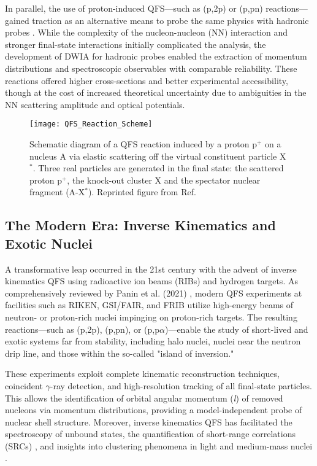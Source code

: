 In parallel, the use of proton-induced \gls{QFS}—such as (p,2p) or (p,pn) reactions—gained traction as an alternative means to probe the same physics with hadronic probes \cite{aumann_quasifree_2013}. While the complexity of the nucleon-nucleon (NN) interaction and stronger final-state interactions initially complicated the analysis, the development of DWIA for hadronic probes enabled the extraction of momentum distributions and spectroscopic observables with comparable reliability. These reactions offered higher cross-sections and better experimental accessibility, though at the cost of increased theoretical uncertainty due to ambiguities in the NN scattering amplitude and optical potentials.

\begin{figure}
	\texttt{[image: QFS\_Reaction\_Scheme]}
	\caption[Schematic of a quasi-free scattering (QFS) reaction]{Schematic diagram of a \gls{QFS} reaction induced by a proton p$^+$ on a nucleus A via elastic scattering off the virtual constituent particle X$^*$. Three real particles are generated in the final state: the scattered proton p$^+$, the knock-out cluster X and the spectator nuclear fragment (A-X$^*$). Reprinted figure from Ref. \cite{panin_quasi-free_2021}}
	\label{fig:QFS_Scheme}
\end{figure}

\subsection{The Modern Era: Inverse Kinematics and Exotic Nuclei}

A transformative leap occurred in the 21st century with the advent of inverse kinematics \gls{QFS} using radioactive ion beams (RIBs) and hydrogen targets. As comprehensively reviewed by Panin et al. (2021) \cite{panin_quasi-free_2021}, modern \gls{QFS} experiments at facilities such as RIKEN, GSI/FAIR, and FRIB utilize high-energy beams of neutron- or proton-rich nuclei impinging on proton-rich targets. The resulting reactions—such as (p,2p), (p,pn), or (p,p$\alpha$)—enable the study of short-lived and exotic systems far from stability, including halo nuclei, nuclei near the neutron drip line, and those within the so-called "island of inversion."

These experiments exploit complete kinematic reconstruction techniques, coincident $\gamma$-ray detection, and high-resolution tracking of all final-state particles. This allows the identification of orbital angular momentum (\emph{l}) of removed nucleons via momentum distributions, providing a model-independent probe of nuclear shell structure. Moreover, inverse kinematics \gls{QFS} has facilitated the spectroscopy of unbound states, the quantification of short-range correlations (SRCs) \cite{hen_nucleon-nucleon_2017,duer_direct_2019,schmidt_probing_2020}, and insights into clustering phenomena in light and medium-mass nuclei \cite{marques_detection_2002,marques_quest_2021,duer_observation_2022}.


